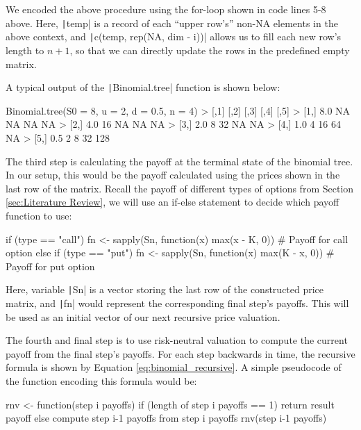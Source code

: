 We encoded the above procedure using the for-loop shown in code lines 5-8 above. Here, \texttt|temp| is a record of each ``upper row's'' non-NA elements in the above context, and \texttt|c(temp, rep(NA, dim - i))| allows us to fill each new row's length to $n+1$, so that we can directly update the rows in the predefined empty matrix.

A typical output of the \texttt|Binomial.tree| function is shown below:

\begin{Rminted}
Binomial.tree(S0 = 8, u = 2, d = 0.5, n = 4)
>      [,1] [,2] [,3] [,4] [,5]
> [1,]  8.0   NA   NA   NA   NA
> [2,]  4.0   16   NA   NA   NA
> [3,]  2.0    8   32   NA   NA
> [4,]  1.0    4   16   64   NA
> [5,]  0.5    2    8   32  128
\end{Rminted}

The third step is calculating the payoff at the terminal state of the binomial tree. In our setup, this would be the payoff calculated using the prices shown in the last row of the matrix. Recall the payoff of different types of options from Section \ref{sec:Literature Review}, we will use an if-else statement to decide which payoff function to use:

\begin{Rminted}
if (type == "call") {
    fn <- sapply(Sn, function(x) {max(x - K, 0)}) # Payoff for call option
} else if (type == "put") {
    fn <- sapply(Sn, function(x) {max(K - x, 0)}) # Payoff for put option
}
\end{Rminted}

Here, variable \texttt|Sn| is a vector storing the last row of the constructed price matrix, and \texttt|fn| would represent the corresponding final step's payoffs. This will be used as an initial vector of our next recursive price valuation.

The fourth and final step is to use risk-neutral valuation to compute the current payoff from the final step's payoffs. For each step backwards in time, the recursive formula is shown by Equation \ref{eq:binomial_recursive}. A simple pseudocode of the function encoding this formula would be:

rnv <- function(step i payoffs) {
    if (length of step i payoffs == 1) {
        return result payoff
    } else {
        compute step i-1 payoffs from step i payoffs
        rnv(step i-1 payoffs)
    }
}

